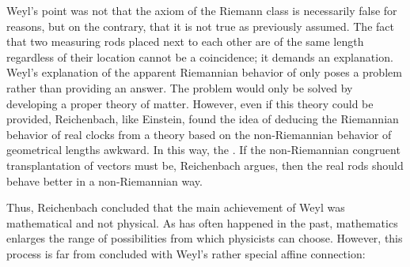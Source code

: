 \documentclass[final]{article}
\begin{document}
Weyl's point was not that the axiom of the Riemann class is necessarily false for \apr reasons, but on the contrary, that it is not \apr true as previously assumed. The fact that two measuring rods placed next to each other are of the same length regardless of their location cannot be a coincidence; it demands an explanation. Weyl's explanation of the apparent Riemannian behavior of  \citep[368]{Reichenbach1922a} only poses a problem rather than providing an answer. The problem would only be solved by developing a proper theory of matter. However, even if this theory could be provided, Reichenbach, like Einstein, found the idea of deducing the Riemannian behavior of real clocks from a theory based on the non-Riemannian behavior of geometrical lengths awkward. In this way, the  \citep[368]{Reichenbach1922a}. If the non-Riemannian congruent transplantation of vectors must be, Reichenbach argues, then the real rods should behave better in a non-Riemannian way.

Thus, Reichenbach concluded that the main achievement of Weyl was mathematical and not physical. As has often happened in the past, mathematics enlarges the range of possibilities from which physicists can choose. However, this process is far from concluded with Weyl's rather special affine connection:
\end{document}
